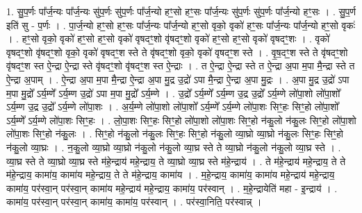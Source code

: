 \documentclass[17pt]{extarticle}
\begin{document}
1. सु॒प॒र्णः पा᳚र्ज॒न्यः पा᳚र्ज॒न्यः सु॑प॒र्णः सु॑प॒र्णः पा᳚र्ज॒न्यो हꣳ॒॒सो हꣳ॒॒सः पा᳚र्ज॒न्यः सु॑प॒र्णः सु॑प॒र्णः पा᳚र्ज॒न्यो हꣳ॒॒सः । . सु॒प॒र्ण इति॑ सु - प॒र्णः । . पा॒र्ज॒न्यो हꣳ॒॒सो हꣳ॒॒सः पा᳚र्ज॒न्यः पा᳚र्ज॒न्यो हꣳ॒॒सो वृको॒ वृको॑ हꣳ॒॒सः पा᳚र्ज॒न्यः पा᳚र्ज॒न्यो हꣳ॒॒सो वृकः॑ । . हꣳ॒॒सो वृको॒ वृको॑ हꣳ॒॒सो हꣳ॒॒सो वृको॑ वृषदꣳ॒॒शो वृ॑षदꣳ॒॒शो वृको॑ हꣳ॒॒सो हꣳ॒॒सो वृको॑ वृषदꣳ॒॒शः । . वृको॑ वृषदꣳ॒॒शो वृ॑षदꣳ॒॒शो वृको॒ वृको॑ वृषदꣳ॒॒श स्ते ते वृ॑षदꣳ॒॒शो वृको॒ वृको॑ वृषदꣳ॒॒श स्ते । . वृ॒ष॒दꣳ॒॒श स्ते ते वृ॑षदꣳ॒॒शो वृ॑षदꣳ॒॒श स्त ऐ॒न्द्रा ऐ॒न्द्रा स्ते वृ॑षदꣳ॒॒शो वृ॑षदꣳ॒॒श स्त ऐ॒न्द्राः । . त ऐ॒न्द्रा ऐ॒न्द्रा स्ते त ऐ॒न्द्रा अ॒पा म॒पा मै॒न्द्रा स्ते त ऐ॒न्द्रा अ॒पाम् । . ऐ॒न्द्रा अ॒पा म॒पा मै॒न्द्रा ऐ॒न्द्रा अ॒पा मु॒द्र उ॒द्रो॑ ऽपा मै॒न्द्रा ऐ॒न्द्रा अ॒पा मु॒द्रः । . अ॒पा मु॒द्र उ॒द्रो॑ ऽपा म॒पा मु॒द्रो᳚ ऽर्य॒म्णे᳚ ऽर्य॒म्ण उ॒द्रो॑ ऽपा म॒पा मु॒द्रो᳚ ऽर्य॒म्णे । . उ॒द्रो᳚ ऽर्य॒म्णे᳚ ऽर्य॒म्ण उ॒द्र उ॒द्रो᳚ ऽर्य॒म्णे लो॑पा॒शो लो॑पा॒शो᳚ ऽर्य॒म्ण उ॒द्र उ॒द्रो᳚ ऽर्य॒म्णे लो॑पा॒शः । . अ॒र्य॒म्णे लो॑पा॒शो लो॑पा॒शो᳚ ऽर्य॒म्णे᳚ ऽर्य॒म्णे लो॑पा॒शः सिꣳ॒॒हः सिꣳ॒॒हो लो॑पा॒शो᳚ ऽर्य॒म्णे᳚ ऽर्य॒म्णे लो॑पा॒शः सिꣳ॒॒हः । . लो॒पा॒शः सिꣳ॒॒हः सिꣳ॒॒हो लो॑पा॒शो लो॑पा॒शः सिꣳ॒॒हो न॑कु॒लो न॑कु॒लः सिꣳ॒॒हो लो॑पा॒शो लो॑पा॒शः सिꣳ॒॒हो न॑कु॒लः । . सिꣳ॒॒हो न॑कु॒लो न॑कु॒लः सिꣳ॒॒हः सिꣳ॒॒हो न॑कु॒लो व्या॒घ्रो व्या॒घ्रो न॑कु॒लः सिꣳ॒॒हः सिꣳ॒॒हो न॑कु॒लो व्या॒घ्रः । . न॒कु॒लो व्या॒घ्रो व्या॒घ्रो न॑कु॒लो न॑कु॒लो व्या॒घ्र स्ते ते व्या॒घ्रो न॑कु॒लो न॑कु॒लो व्या॒घ्र स्ते । . व्या॒घ्र स्ते ते व्या॒घ्रो व्या॒घ्र स्ते म॑हे॒न्द्राय॑ महे॒न्द्राय॒ ते व्या॒घ्रो व्या॒घ्र स्ते म॑हे॒न्द्राय॑ । . ते म॑हे॒न्द्राय॑ महे॒न्द्राय॒ ते ते म॑हे॒न्द्राय॒ कामा॑य॒ कामा॑य महे॒न्द्राय॒ ते ते म॑हे॒न्द्राय॒ कामा॑य । . म॒हे॒न्द्राय॒ कामा॑य॒ कामा॑य महे॒न्द्राय॑ महे॒न्द्राय॒ कामा॑य॒ पर॑स्वा॒न् पर॑स्वा॒न् कामा॑य महे॒न्द्राय॑ महे॒न्द्राय॒ कामा॑य॒ पर॑स्वान् । . म॒हे॒न्द्रायेति॑ महा - इ॒न्द्राय॑ । . कामा॑य॒ पर॑स्वा॒न् पर॑स्वा॒न् कामा॑य॒ कामा॑य॒ पर॑स्वान् । . पर॑स्वा॒निति॒ पर॑स्वान्न् । \newline
\pagebreak
{}
\end{document}

